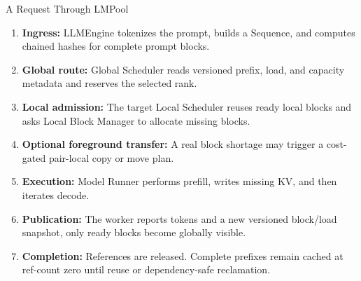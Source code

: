 \documentclass[aspectratio=169,10pt]{beamer}
\newcommand{\sys}{LMPool}
\newcommand{\metric}[1]{\textcolor{LMBlue}{\bfseries #1}}
\begin{document}
\begin{frame}{A Request Through \sys{}}
  \small
  \begin{enumerate}
    \item \metric{Ingress:} LLMEngine tokenizes the prompt, builds a Sequence, and computes chained hashes for complete prompt blocks.
    \item \metric{Global route:} Global Scheduler reads versioned prefix, load, and capacity metadata and reserves the selected rank.
    \item \metric{Local admission:} The target Local Scheduler reuses ready local blocks and asks Local Block Manager to allocate missing blocks.
    \item \metric{Optional foreground transfer:} A real block shortage may trigger a cost-gated pair-local copy or move plan.
    \item \metric{Execution:} Model Runner performs prefill, writes missing KV, and then iterates decode.
    \item \metric{Publication:} The worker reports tokens and a new versioned block/load snapshot, only ready blocks become globally visible.
    \item \metric{Completion:} References are released. Complete prefixes remain cached at ref-count zero until reuse or dependency-safe reclamation.
  \end{enumerate}
\end{frame}
\end{document}
